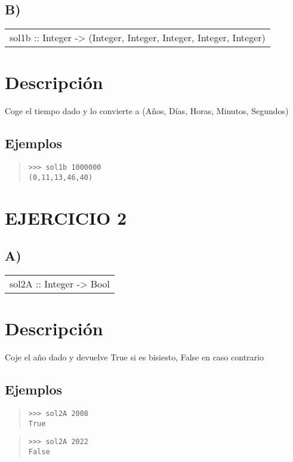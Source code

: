 \subsection{B)}
\begin{haddockdesc}
\item[\begin{tabular}{@{}l}
sol1b :: Integer -> (Integer, Integer, Integer, Integer, Integer)
\end{tabular}]
{\haddockbegindoc
\section*{Descripción}
Coge el tiempo dado y lo convierte a (Años, Días, Horas, Minutos, Segundos)\par
\subsection*{Ejemplos}
\begin{quote}
{\haddockverb\begin{verbatim}
>>> sol1b 1000000
(0,11,13,46,40)

\end{verbatim}}
\end{quote}}
\end{haddockdesc}
\section{EJERCICIO 2}
\subsection{A)}
\begin{haddockdesc}
\item[\begin{tabular}{@{}l}
sol2A :: Integer -> Bool
\end{tabular}]
{\haddockbegindoc
\section*{Descripción}
Coje el año dado y devuelve True si es bisiesto, False en caso contrario\par
\subsection*{Ejemplos}
\begin{quote}
{\haddockverb\begin{verbatim}
>>> sol2A 2008
True

\end{verbatim}}
\end{quote}
\begin{quote}
{\haddockverb\begin{verbatim}
>>> sol2A 2022
False

\end{verbatim}}
\end{quote}}
\end{haddockdesc}
